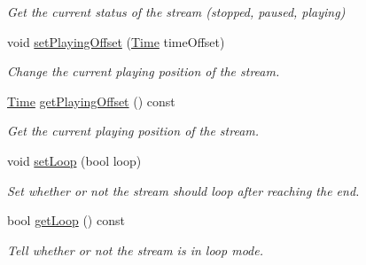 \begin{DoxyCompactItemize}
\begin{DoxyCompactList}\small\item\em Get the current status of the stream (stopped, paused, playing) \end{DoxyCompactList}\item 
void \hyperlink{classsf_1_1SoundStream_af416a5f84c8750d2acb9821d78bc8646}{set\+Playing\+Offset} (\hyperlink{classsf_1_1Time}{Time} time\+Offset)
\begin{DoxyCompactList}\small\item\em Change the current playing position of the stream. \end{DoxyCompactList}\item 
\hyperlink{classsf_1_1Time}{Time} \hyperlink{classsf_1_1SoundStream_ae288f3c72edbad9cc7ee938ce5b907c1}{get\+Playing\+Offset} () const
\begin{DoxyCompactList}\small\item\em Get the current playing position of the stream. \end{DoxyCompactList}\item 
void \hyperlink{classsf_1_1SoundStream_a43fade018ffba7e4f847a9f00b353f3d}{set\+Loop} (bool loop)
\begin{DoxyCompactList}\small\item\em Set whether or not the stream should loop after reaching the end. \end{DoxyCompactList}\item 
bool \hyperlink{classsf_1_1SoundStream_a49d263f9bbaefec4b019bd05fda59b25}{get\+Loop} () const
\begin{DoxyCompactList}\small\item\em Tell whether or not the stream is in loop mode. \end{DoxyCompactList}\end{DoxyCompactItemize}
